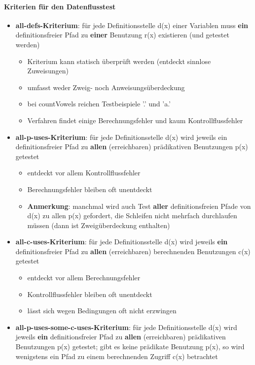 \paragraph{Kriterien für den Datenflusstest}
\begin{itemize}
	\item \textbf{all-defs-Kriterium}: für jede Definitionsstelle d(x) einer Variablen muss \textbf{ein} definitionsfreier Pfad zu \textbf{einer} Benutzung r(x) existieren (und getestet werden)
	\begin{itemize}
		\item Kriterium kann statisch überprüft werden (entdeckt sinnlose Zuweisungen)
		\item umfasst weder Zweig- noch Anweisungsüberdeckung
		\item bei countVowels reichen Testbeispiele '.' und 'a.'
		\item Verfahren findet einige Berechnungsfehler und kaum Kontrollflussfehler
	\end{itemize}
	\item \textbf{all-p-uses-Kriterium}: für jede Definitionsstelle d(x) wird jeweils ein definitionsfreier Pfad zu \textbf{allen} (erreichbaren) prädikativen Benutzungen p(x) getestet
	\begin{itemize}
		\item entdeckt vor allem Kontrollflussfehler
		\item Berechnungsfehler bleiben oft unentdeckt
		\item \textbf{Anmerkung}: manchmal wird auch Test \textbf{aller} definitionsfreien Pfade von d(x) zu allen p(x) gefordert, die Schleifen nicht mehrfach durchlaufen müssen (dann ist Zweigüberdeckung enthalten)
	\end{itemize}
	\item \textbf{all-c-uses-Kriterium}: für jede Definitionsstelle d(x) wird jeweils \textbf{ein} definitionsfreier Pfad zu \textbf{allen} (erreichbaren) berechnenden Benutzungen c(x) getestet
	\begin{itemize}
		\item entdeckt vor allem Berechnungsfehler
		\item Kontrollflussfehler bleiben oft unentdeckt
		\item lässt sich wegen Bedingungen oft nicht erzwingen
	\end{itemize}
	\item \textbf{all-p-uses-some-c-uses-Kriterium}: für jede Definitionsstelle d(x) wird jeweils \textbf{ein} definitionsfreier Pfad zu \textbf{allen} (erreichbaren) prädikativen Benutzungen p(x) getestet; gibt es keine prädikate Benutzung p(x), so wird wenigstens ein Pfad zu einem berechnenden Zugriff c(x) betrachtet

\end{itemize}

